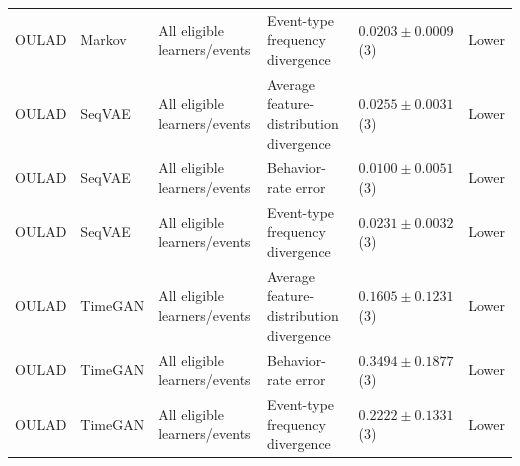 \begin{longtable}{@{}p{2.25cm}p{2.05cm}p{4.7cm}p{5.0cm}p{2.6cm}p{1.25cm}@{}}
OULAD & Markov & All eligible learners/events & Event-type frequency divergence & $0.0203 \mathbin{\pm} 0.0009$ (3) & Lower \\
OULAD & SeqVAE & All eligible learners/events & Average feature-distribution divergence & $0.0255 \mathbin{\pm} 0.0031$ (3) & Lower \\
OULAD & SeqVAE & All eligible learners/events & Behavior-rate error & $0.0100 \mathbin{\pm} 0.0051$ (3) & Lower \\
OULAD & SeqVAE & All eligible learners/events & Event-type frequency divergence & $0.0231 \mathbin{\pm} 0.0032$ (3) & Lower \\
OULAD & TimeGAN & All eligible learners/events & Average feature-distribution divergence & $0.1605 \mathbin{\pm} 0.1231$ (3) & Lower \\
OULAD & TimeGAN & All eligible learners/events & Behavior-rate error & $0.3494 \mathbin{\pm} 0.1877$ (3) & Lower \\
OULAD & TimeGAN & All eligible learners/events & Event-type frequency divergence & $0.2222 \mathbin{\pm} 0.1331$ (3) & Lower \\
\end{longtable}
